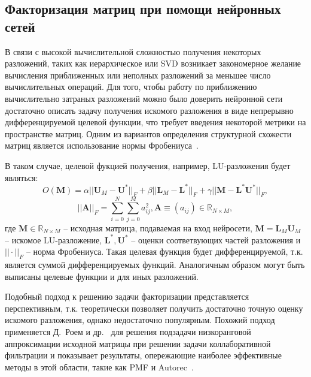 
\subsection{Факторизация матриц при помощи нейронных сетей}
В связи с высокой вычислительной сложностью получения некоторых разложений, таких как иерархическое или SVD возникает закономерное желание вычисления приближенных или неполных разложений за меньшее число вычислительных операций. Для того, чтобы работу по приближению вычислительно затраных разложений можно было доверить нейронной сети достаточно описать задачу получения искомого разложения в виде непрерывно дифференцируемой целевой функции, что требует введения некоторой метрики на пространстве матриц. Одним из вариантов определения структурной схожести матриц является использование нормы Фробениуса~\cite{wikiMatrixNorm}.


В таком случае, целевой фукцией получения, например, LU-разложения будет являться:
\[
	O(\mathbf{M}) = \alpha|| \mathbf{U}_M - \mathbf{U}^{*} ||_{F} + \beta|| \mathbf{L}_M - \mathbf{L}^{*} ||_{F} + \gamma|| \mathbf{M} - \mathbf{L}^{*} \mathbf{U}^{*} ||_{F},
\]
\[
	||\mathbf{A}||_{F} = \sum \limits_{i=0}^N \sum \limits_{j=0}^M a^2_{ij}, \mathbf{A} \equiv (a_{ij}) \in \mathbb{R}_{N \times M},
\]
где $\mathbf{M} \in \mathbb{R}_{N \times M}$ -- исходная матрица, подаваемая на вход нейросети, $\mathbf{M} = \mathbf{L}_M\mathbf{U}_M$ -- искомое LU-разложение, $\mathbf{L}^{*}, \mathbf{U}^{*}$ -- оценки соответвующих частей разложения и $||\cdot||_{F}$ -- норма Фробениуса. Такая целевая функция будет дифференцируемой, т.к. является суммой дифференцируемых функций. Аналогичным образом могут быть выписаны целевые функции и для иных разложений.


Подобный подход к решению задачи факторизации представляется перспективным, т.к. теоретически позволяет получить достаточно точную оценку искомого разложения, однако недостаточно популярным. Похожий подход применяется Д.~Роем и др.~\cite{nnFactorization} для решения подзадачи низкоранговой аппроксимации исходной матрицы при решении задачи коллаборативной фильтрации и показывает результаты, опережающие наиболее эффективные методы в этой области, такие как PMF и Autorec~\cite{autorec}.


